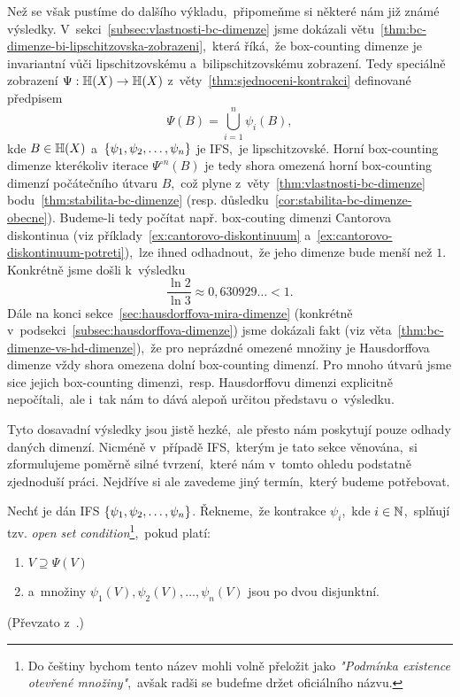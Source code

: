 Než se však pustíme do dalšího výkladu,~připomeňme si některé nám již známé výsledky. V~sekci~\ref{subsec:vlastnosti-bc-dimenze} jsme dokázali větu~\ref{thm:bc-dimenze-bi-lipschitzovska-zobrazeni},~která říká,~že box-counting dimenze je invariantní vůči lipschitzovskému a~bilipschitzovskému zobrazení. Tedy speciálně zobrazení $\Psi:\mathbb{H}(X) \rightarrow \mathbb{H}(X)$ z~věty~\ref{thm:sjednoceni-kontrakci} definované předpisem
\[\Psi(B)=\bigcup_{i=1}^n\psi_i(B),\]
kde $B\in\mathbb{H}(X)$ a~$\left\{\psi_1,\psi_2,\ldots,\psi_n\right\}$ je IFS,~je lipschitzovské. Horní box-counting dimenze kterékoliv iterace $\Psi^{\circ n}(B)$ je tedy shora omezená horní box-counting dimenzí počátečního útvaru $B$,~což plyne z~věty~\ref{thm:vlastnosti-bc-dimenze} bodu~\ref{thm:stabilita-bc-dimenze} (resp. důsledku~\ref{cor:stabilita-bc-dimenze-obecne}). Budeme-li tedy počítat např. box-couting dimenzi Cantorova diskontinua (viz příklady~\ref{ex:cantorovo-diskontinuum} a~\ref{ex:cantorovo-diskontinuum-potreti}),~lze ihned odhadnout,~že jeho dimenze bude menší než $1$. Konkrétně jsme došli k~výsledku
\[\dfrac{\ln{2}}{\ln{3}}\approx0{,}630929\ldots<1.\]
Dále na konci sekce~\ref{sec:hausdorffova-mira-dimenze} (konkrétně v~podsekci~\ref{subsec:hausdorffova-dimenze}) jsme dokázali fakt (viz věta~\ref{thm:bc-dimenze-vs-hd-dimenze}),~že pro neprázdné omezené množiny je Hausdorffova dimenze vždy shora omezena dolní box-counting dimenzí. Pro mnoho útvarů jsme sice jejich box-counting dimenzi,~resp. Hausdorffovu dimenzi explicitně nepočítali,~ale i~tak nám to dává alepoň určitou představu o~výsledku.

Tyto dosavadní výsledky jsou jistě hezké,~ale přesto nám poskytují pouze odhady daných dimenzí. Nicméně v~případě IFS,~kterým je tato sekce věnována,~si zformulujeme poměrně silné tvrzení,~které nám v~tomto ohledu podstatně zjednoduší práci. Nejdříve si ale zavedeme jiný termín,~který budeme potřebovat.
\begin{definition}\label{def:open-set-condition}
    Nechť je dán IFS $\left\{\psi_1,\psi_2,\ldots,\psi_n\right\}$. Řekneme,~že kontrakce $\psi_i$,~kde $i\in\mathbb{N}$,~splňují tzv. \emph{open set condition}\footnote{Do češtiny bychom tento název mohli volně přeložit jako \emph{"Podmínka existence otevřené množiny"},~avšak radši se budefme držet oficiálního názvu.},~pokud platí:
    \begin{enumerate}[label=(\alph*)]
        \item $V\supseteq\Psi(V)$
        \item a~množiny $\psi_1(V),\psi_2(V),\ldots,\psi_n(V)$ jsou po dvou disjunktní.
    \end{enumerate}
\end{definition}
(Převzato z~\citep[str. 139]{Falconer1989}.)

